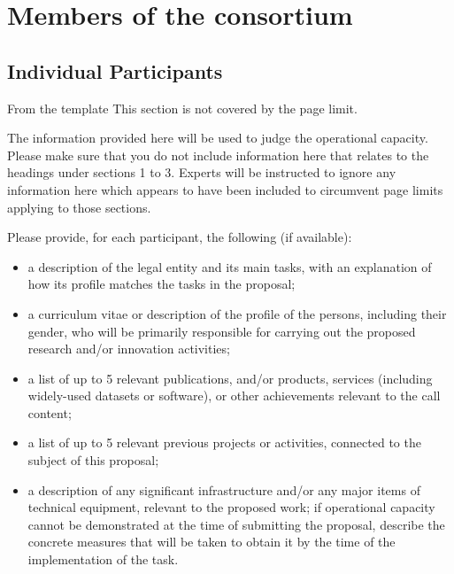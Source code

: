 \chapter{Members of the consortium}

\section{Individual Participants}\label{sec:partners}

\begin{todo}{From the template}
This section is not covered by the page limit.

The information provided here will be used to judge the operational capacity. Please make sure that you do not include information here that relates to the headings under sections 1 to 3. Experts will be instructed to ignore any information here which appears to have been included to circumvent page limits applying to those sections.

Please provide, for each participant, the following (if available):
\begin{itemize}
\item a description of the legal entity and its main tasks, with an explanation of how its profile matches the tasks in the proposal;
\item a curriculum vitae or description of the profile of the persons, including their gender, who will be primarily responsible for carrying out the proposed research and/or innovation activities;
\item a list of up to 5 relevant publications, and/or products, services (including widely-used datasets or software), or other achievements relevant to the  call content;
\item a list of up to 5 relevant previous projects or activities, connected to the subject of this proposal;
\item a description of any significant infrastructure and/or any major items of technical equipment, relevant to the proposed work;
if operational capacity cannot be demonstrated at the time of submitting the proposal, describe the concrete measures that will be taken to obtain it by the time of the implementation of the task.
\end{itemize}
\end{todo}


































